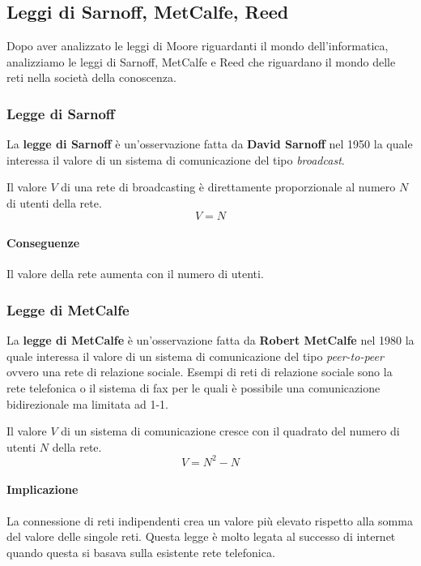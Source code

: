     \subsection{Leggi di Sarnoff, MetCalfe, Reed}
        Dopo aver analizzato le leggi di Moore riguardanti il mondo dell'informatica, analizziamo le leggi di Sarnoff, MetCalfe e Reed che riguardano il mondo delle reti nella società della conoscenza.
        \subsubsection{Legge di Sarnoff}
            La \textbf{legge di Sarnoff} è un'osservazione fatta da \textbf{David Sarnoff} nel 1950 la quale interessa il valore di un sistema di comunicazione del tipo \textit{broadcast}.
            \begin{definition}
                Il valore $V$ di una rete di broadcasting è direttamente proporzionale al numero $N$ di utenti della rete. 
                $$ V = N $$
            \end{definition}
            \paragraph{Conseguenze} Il valore della rete aumenta con il numero di utenti.
        \subsubsection{Legge di MetCalfe}
            La \textbf{legge di MetCalfe} è un'osservazione fatta da \textbf{Robert MetCalfe} nel 1980 la quale interessa il valore di un sistema di comunicazione del tipo \textit{peer-to-peer} ovvero una rete di relazione sociale. Esempi di reti di relazione sociale sono la rete telefonica o il sistema di fax per le quali è possibile una comunicazione bidirezionale ma limitata ad 1-1.
            \begin{definition}
                Il valore $ V $ di un sistema di comunicazione cresce con il quadrato del numero di utenti $ N $ della rete.
                $$ V = N^2 - N $$
            \end{definition}
            \paragraph{Implicazione} La connessione di reti indipendenti crea un valore più elevato rispetto alla somma del valore delle singole reti. Questa legge è molto legata al successo di internet quando questa si basava sulla esistente rete telefonica.

